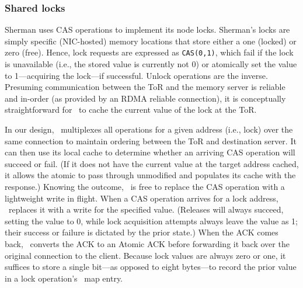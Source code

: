 \subsubsection{Shared locks}
\label{sec:locking-algorithm}

Sherman uses CAS operations to implement its node locks.
%
Sherman's locks are simply specific (NIC-hosted) memory locations that
store either a one (locked) or zero (free).  Hence, lock requests are
expressed as \texttt{CAS(0,1)}, which fail if the lock is unavailable
(i.e., the stored value is currently not 0) or atomically set the
value to 1---acquiring the lock---if successful. Unlock operations are
the inverse.  Presuming communication between the ToR and the memory
server is reliable and in-order (as provided by an RDMA reliable
connection), it is conceptually straightforward for \sword\ to cache
the current value of the lock at the ToR.

In our design, \sword\ multiplexes all operations for a given address
(i.e., lock) over the same connection to maintain ordering between the
ToR and destination server.  It can then use its local cache to
determine whether an arriving CAS operation will succeed or fail.  (If
it does not have the current value at the target address cached, it
allows the atomic to pass through unmodified and populates its cache
with the response.)  Knowing the outcome, \sword\ is free to replace
the CAS operation with a lightweight write in flight.  When a CAS
operation arrives for a lock address, \sword\ replaces it with a write
for the specified value.  (Releases will always succeed, setting the
value to 0, while lock acquisition attempts always leave the value as
1; their success or failure is dictated by the prior state.)  When the
ACK comes back, \sword\ converts the ACK to an Atomic ACK before
forwarding it back over the original connection to the client.
Because lock values are always zero or one, it suffices to store a
single bit---as opposed to eight bytes---to record the prior value in
a lock operation's \sword\ map entry.

